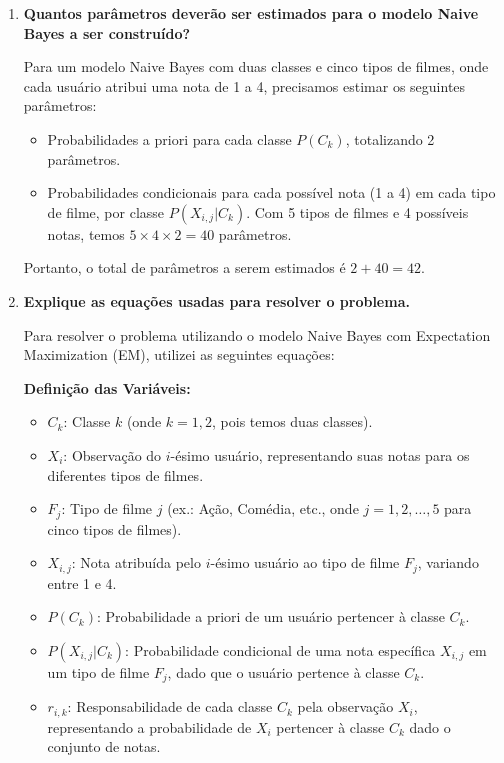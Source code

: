 \begin{enumerate}[label=(\alph*)]

    \item \textbf{Quantos parâmetros deverão ser estimados para o modelo Naive Bayes a ser construído?}

        Para um modelo Naive Bayes com duas classes e cinco tipos de filmes, onde cada usuário atribui uma nota de 1 a 4, precisamos estimar os seguintes parâmetros:
        
        \begin{itemize}
            \item Probabilidades a priori para cada classe \( P(C_k) \), totalizando 2 parâmetros.
            \item Probabilidades condicionais para cada possível nota (1 a 4) em cada tipo de filme, por classe \( P(X_{i,j} | C_k) \). Com 5 tipos de filmes e 4 possíveis notas, temos \(5 \times 4 \times 2 = 40\) parâmetros.
        \end{itemize}
        
        Portanto, o total de parâmetros a serem estimados é \(2 + 40 = 42\).

        
    \item \textbf{Explique as equações usadas para resolver o problema.}

        Para resolver o problema utilizando o modelo Naive Bayes com Expectation Maximization (EM), utilizei as seguintes equações:
        
        \textbf{Definição das Variáveis:}
        \begin{itemize}
            \item \( C_k \): Classe \( k \) (onde \( k = 1, 2 \), pois temos duas classes).
            \item \( X_i \): Observação do \( i \)-ésimo usuário, representando suas notas para os diferentes tipos de filmes.
            \item \( F_j \): Tipo de filme \( j \) (ex.: Ação, Comédia, etc., onde \( j = 1, 2, \ldots, 5 \) para cinco tipos de filmes).
            \item \( X_{i,j} \): Nota atribuída pelo \( i \)-ésimo usuário ao tipo de filme \( F_j \), variando entre 1 e 4.
            \item \( P(C_k) \): Probabilidade a priori de um usuário pertencer à classe \( C_k \).
            \item \( P(X_{i,j} | C_k) \): Probabilidade condicional de uma nota específica \( X_{i,j} \) em um tipo de filme \( F_j \), dado que o usuário pertence à classe \( C_k \).
            \item \( r_{i,k} \): Responsabilidade de cada classe \( C_k \) pela observação \( X_i \), representando a probabilidade de \( X_i \) pertencer à classe \( C_k \) dado o conjunto de notas.
        \end{itemize}
        

\end{enumerate}
